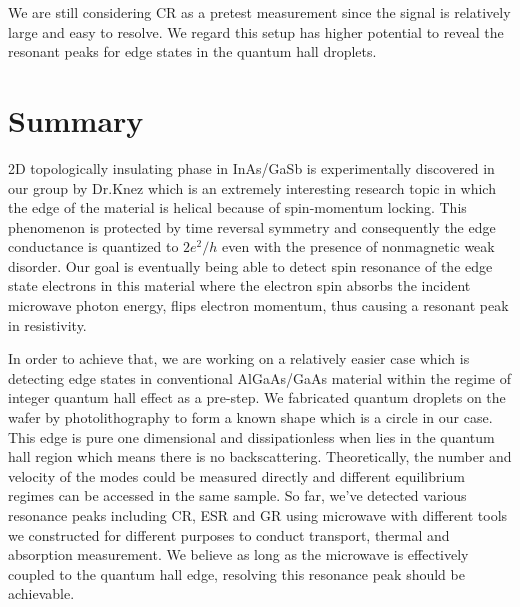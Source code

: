 \documentclass[12pt]{ruthesis}
\begin{document}
We are still considering CR as a pretest measurement since the signal is relatively large and easy to resolve. 
We regard this setup has higher potential to reveal the resonant peaks for edge states in the quantum hall droplets.    





\chapter{Summary}\label{summary}
2D topologically insulating phase in InAs/GaSb is experimentally discovered in our group by Dr.Knez \cite{IvanThesis} which is an extremely interesting research topic in which the edge of the material is helical because of spin-momentum locking. 
This phenomenon is protected by time reversal symmetry and consequently the edge conductance is quantized to $2e^{2}/h$ even with the presence of nonmagnetic weak disorder. 
Our goal is eventually being able to detect spin resonance of the edge state electrons in this material where the electron spin absorbs the incident microwave photon energy, flips electron momentum, thus causing a resonant peak in resistivity. 


In order to achieve that, we are working on a relatively easier case which is detecting edge states in conventional AlGaAs/GaAs material within the regime of integer quantum hall effect as a pre-step.
We fabricated quantum droplets on the wafer by photolithography to form a known shape which is a circle in our case. This edge is pure one dimensional and dissipationless when lies in the quantum hall region which means there is no backscattering. Theoretically, the number and velocity of the modes could be measured directly and different equilibrium regimes can be accessed in the same sample.
So far, we've detected various resonance peaks including CR, ESR and GR using microwave with different tools we constructed for different purposes to conduct transport, thermal and absorption measurement.  
We believe as long as the microwave is effectively coupled to the quantum hall edge, resolving this resonance peak should be achievable.  



\appendix



\end{document}

